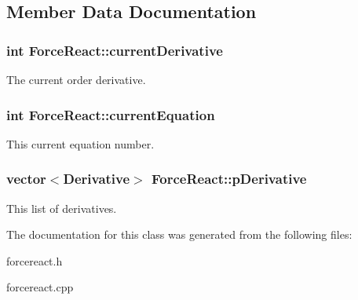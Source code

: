 \subsection{Member Data Documentation}
\hypertarget{class_force_react_a8dc7b57cd803c0cba35613ff0f8be1ef}{
\subsubsection[{current\-Derivative}]{\setlength{\rightskip}{0pt plus 5cm}int Force\-React\-::current\-Derivative\hspace{0.3cm}{\ttfamily [protected]}}}\label{class_force_react_a8dc7b57cd803c0cba35613ff0f8be1ef}
The current order derivative. \hypertarget{class_force_react_a124b3309513a17df0c1d704f9550005f}{
\subsubsection[{current\-Equation}]{\setlength{\rightskip}{0pt plus 5cm}int Force\-React\-::current\-Equation\hspace{0.3cm}{\ttfamily [protected]}}}\label{class_force_react_a124b3309513a17df0c1d704f9550005f}
This current equation number. \hypertarget{class_force_react_acc35d8bc370b9b2dff713c91876185dd}{
\subsubsection[{p\-Derivative}]{\setlength{\rightskip}{0pt plus 5cm}vector$<${\bf Derivative}$>$ Force\-React\-::p\-Derivative\hspace{0.3cm}{\ttfamily [protected]}}}\label{class_force_react_acc35d8bc370b9b2dff713c91876185dd}
This list of derivatives. 

The documentation for this class was generated from the following files\-:\begin{DoxyCompactItemize}
\item 
forcereact.\-h\item 
forcereact.\-cpp\end{DoxyCompactItemize}
